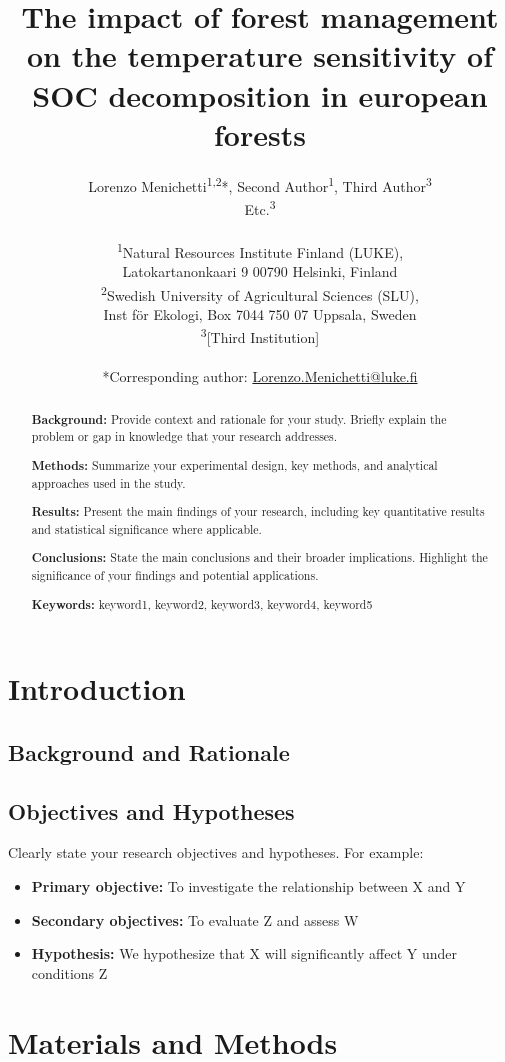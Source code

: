 \documentclass[12pt,a4paper]{article}
\title{\textbf{The impact of forest management on the temperature sensitivity of SOC decomposition in european forests}}
\author{
    Lorenzo Menichetti\textsuperscript{1,2}*, 
    Second Author\textsuperscript{1}, 
    Third Author\textsuperscript{3}\\
    Etc.\textsuperscript{3}\\
    \\
    \textsuperscript{1}Natural Resources Institute Finland (LUKE), \\
    \hspace*{0.5cm}Latokartanonkaari 9 00790 Helsinki, Finland\\
    \textsuperscript{2}Swedish University of Agricultural Sciences (SLU), \\
    \hspace*{0.5cm}Inst för Ekologi, Box 7044 750 07 Uppsala, Sweden\\
    \textsuperscript{3}[Third Institution]\\
    \\
    *Corresponding author: \href{mailto:Lorenzo.Menichetti@luke.fi}{Lorenzo.Menichetti@luke.fi}
}
\date{}
\begin{document}
\maketitle

\begin{abstract}
\noindent
\textbf{Background:} Provide context and rationale for your study. Briefly explain the problem or gap in knowledge that your research addresses.

\textbf{Methods:} Summarize your experimental design, key methods, and analytical approaches used in the study.

\textbf{Results:} Present the main findings of your research, including key quantitative results and statistical significance where applicable.

\textbf{Conclusions:} State the main conclusions and their broader implications. Highlight the significance of your findings and potential applications.

\textbf{Keywords:} keyword1, keyword2, keyword3, keyword4, keyword5
\end{abstract}

\newpage

\section{Introduction}


\subsection{Background and Rationale}


\subsection{Objectives and Hypotheses}

Clearly state your research objectives and hypotheses. For example:
\begin{itemize}
    \item \textbf{Primary objective:} To investigate the relationship between X and Y
    \item \textbf{Secondary objectives:} To evaluate Z and assess W
    \item \textbf{Hypothesis:} We hypothesize that X will significantly affect Y under conditions Z
\end{itemize}






\section{Materials and Methods}
\end{document}

